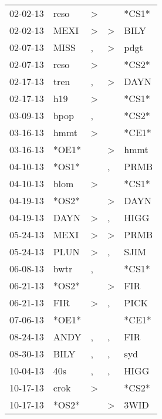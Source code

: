 \begin{supertabular}{lllll}
 02-02-13 &   reso &     \textgreater &                  &  *CS1* \\
 02-02-13 &   MEXI &     \textgreater &     \textgreater &   BILY \\
 02-07-13 &   MISS &                , &     \textgreater &   pdgt \\
 02-07-13 &   reso &     \textgreater &                  &  *CS2* \\
 02-17-13 &   tren &                , &     \textgreater &   DAYN \\
 02-17-13 &    h19 &     \textgreater &                  &  *CS1* \\
 03-09-13 &   bpop &                , &                  &  *CS2* \\
 03-16-13 &   hmmt &     \textgreater &                  &  *CE1* \\
 03-16-13 &  *OE1* &                  &     \textgreater &   hmmt \\
 04-10-13 &  *OS1* &                  &                , &   PRMB \\
 04-10-13 &   blom &     \textgreater &                  &  *CS1* \\
 04-19-13 &  *OS2* &                  &     \textgreater &   DAYN \\
 04-19-13 &   DAYN &     \textgreater &                , &   HIGG \\
 05-24-13 &   MEXI &     \textgreater &     \textgreater &   PRMB \\
 05-24-13 &   PLUN &     \textgreater &                , &   SJIM \\
 06-08-13 &   bwtr &                , &                  &  *CS1* \\
 06-21-13 &  *OS2* &                  &     \textgreater &    FIR \\
 06-21-13 &    FIR &     \textgreater &                , &   PICK \\
 07-06-13 &  *OE1* &                  &                  &  *CE1* \\
 08-24-13 &   ANDY &                , &                , &    FIR \\
 08-30-13 &   BILY &                , &                , &    syd \\
 10-04-13 &    40s &                , &                , &   HIGG \\
 10-17-13 &   crok &     \textgreater &                  &  *CS2* \\
 10-17-13 &  *OS2* &                  &     \textgreater &   3WID \\

\end{supertabular}

